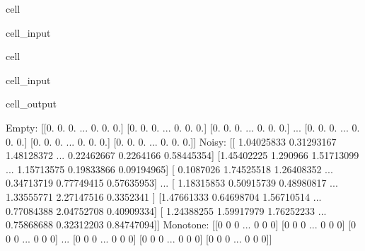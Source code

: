 \documentclass[letterpaper,10pt,english]{jupyterBook}
\begin{document}
\begin{sphinxuseclass}{cell}
\begin{sphinxVerbatimInput}
\begin{sphinxuseclass}{cell_input}
\end{sphinxuseclass}\end{sphinxVerbatimInput}

\end{sphinxuseclass}
\begin{sphinxuseclass}{cell}\begin{sphinxVerbatimInput}

\begin{sphinxuseclass}{cell_input}
\begin{sphinxVerbatim}[commandchars=\\\{\}]
\end{sphinxVerbatim}

\end{sphinxuseclass}\end{sphinxVerbatimInput}
\begin{sphinxVerbatimOutput}

\begin{sphinxuseclass}{cell_output}
\begin{sphinxVerbatim}[commandchars=\\\{\}]
Empty:
 [[0. 0. 0. ... 0. 0. 0.]
 [0. 0. 0. ... 0. 0. 0.]
 [0. 0. 0. ... 0. 0. 0.]
 ...
 [0. 0. 0. ... 0. 0. 0.]
 [0. 0. 0. ... 0. 0. 0.]
 [0. 0. 0. ... 0. 0. 0.]]
Noisy:
 [[ 1.04025833  0.31293167 \PYGZhy{}1.48128372 ...  0.22462667  0.2264166
   0.58445354]
 [\PYGZhy{}1.45402225  1.290966   \PYGZhy{}1.51713099 ...  1.15713575 \PYGZhy{}0.19833866
  \PYGZhy{}0.09194965]
 [ 0.1087026   1.74525518 \PYGZhy{}1.26408352 ... \PYGZhy{}0.34713719 \PYGZhy{}0.77749415
  \PYGZhy{}0.57635953]
 ...
 [ 1.18315853  0.50915739 \PYGZhy{}0.48980817 ... \PYGZhy{}1.33555771  2.27147516
   0.3352341 ]
 [\PYGZhy{}1.47661333  0.64698704 \PYGZhy{}1.56710514 ...  0.77084388 \PYGZhy{}2.04752708
  \PYGZhy{}0.40909334]
 [ 1.24388255 \PYGZhy{}1.59917979  1.76252233 ... \PYGZhy{}0.75868688  0.32312203
   0.84747094]]
Monotone:
 [[0 0 0 ... 0 0 0]
 [0 0 0 ... 0 0 0]
 [0 0 0 ... 0 0 0]
 ...
 [0 0 0 ... 0 0 0]
 [0 0 0 ... 0 0 0]
 [0 0 0 ... 0 0 0]]
\end{sphinxVerbatim}

\end{sphinxuseclass}\end{sphinxVerbatimOutput}

\end{sphinxuseclass}
\sphinxstepscope
\end{document}
